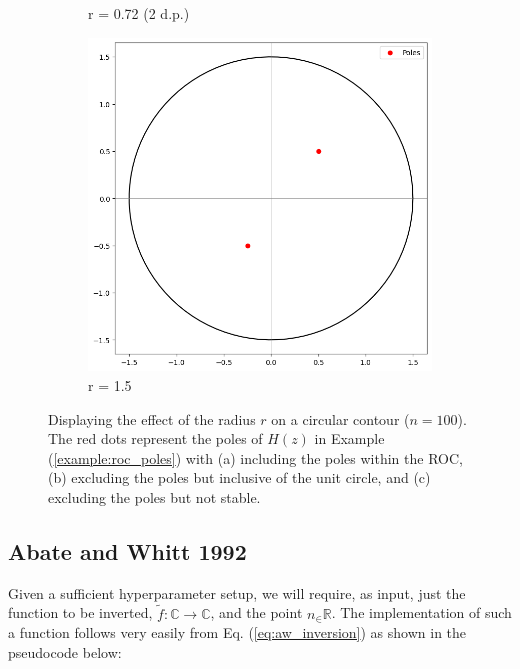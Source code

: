 \documentclass[a4paper]{report}
\begin{document}
\begin{figure}[H]
\begin{subfigure}{.25\linewidth}
      \caption{r = 0.72 (2 d.p.)}
      \label{fig:valid_r}
    \end{subfigure}\hfill
    \begin{subfigure}{.25\linewidth}
      \includegraphics[width=\linewidth]{images/unstable_contour.png}
      \caption{r = 1.5}
    \end{subfigure}\hfill
    
    \caption{ Displaying the effect of the radius $r$ on a circular contour ($n = 100$). The red dots represent the poles of $H(z)$ in Example (\ref{example:roc_poles}) with (a) including the poles within the ROC, (b) excluding the poles but inclusive of the unit circle, and (c) excluding the poles but not stable.}
    \label{fig:effect_r}
\end{figure}

\subsection{Abate and Whitt 1992}\label{sec:experiment_aw}
Given a sufficient hyperparameter setup, we will require, as input,  just the function to be inverted, $\tilde{f}: \mathbb{C}\rightarrow \mathbb{C}$, and the point $n_\in \mathbb{R}$. The implementation of such a function follows very easily from Eq. (\ref{eq:aw_inversion}) as shown in the pseudocode below:
\end{document}
